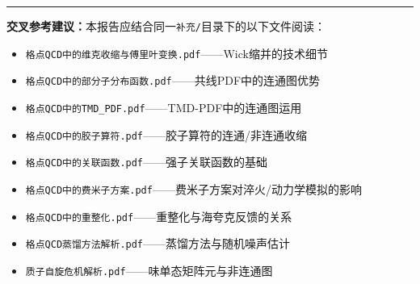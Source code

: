 \documentclass[12pt,a4paper]{ctexart}
\theoremstyle{definition}
\begin{document}
\vspace{0.5cm}
\noindent\rule{\textwidth}{0.5pt}
\small
\textbf{交叉参考建议：}本报告应结合同一\texttt{补充/}目录下的以下文件阅读：
\begin{itemize}[nosep]
    \item \texttt{格点QCD中的维克收缩与傅里叶变换.pdf}——Wick缩并的技术细节
    \item \texttt{格点QCD中的部分子分布函数.pdf}——共线PDF中的连通图优势
    \item \texttt{格点QCD中的TMD\_PDF.pdf}——TMD-PDF中的连通图运用
    \item \texttt{格点QCD中的胶子算符.pdf}——胶子算符的连通/非连通收缩
    \item \texttt{格点QCD中的关联函数.pdf}——强子关联函数的基础
    \item \texttt{格点QCD中的费米子方案.pdf}——费米子方案对淬火/动力学模拟的影响
    \item \texttt{格点QCD中的重整化.pdf}——重整化与海夸克反馈的关系
    \item \texttt{格点QCD蒸馏方法解析.pdf}——蒸馏方法与随机噪声估计
    \item \texttt{质子自旋危机解析.pdf}——味单态矩阵元与非连通图
\end{itemize}
\end{document}
